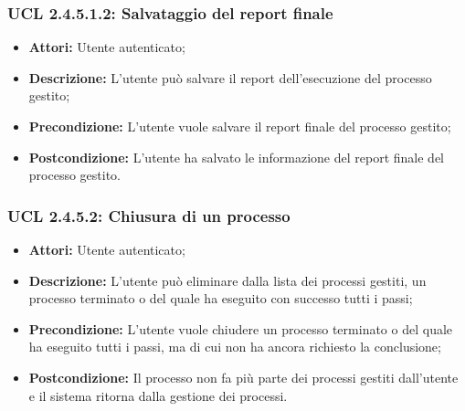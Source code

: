 \hypertarget{L2.4.5.1.2}{}
\subsubsection{UCL 2.4.5.1.2: Salvataggio del report finale}
\begin{itemize}
\item \textbf{Attori:} Utente autenticato;
\item \textbf{Descrizione:} L'utente può salvare il report dell'esecuzione del processo gestito;
\item \textbf{Precondizione:} L'utente vuole salvare il report finale del processo gestito;
\item \textbf{Postcondizione:} L'utente ha salvato le informazione del report finale del processo gestito.
\end{itemize}

\hypertarget{L2.4.5.2}{}
\subsubsection{UCL 2.4.5.2: Chiusura di un processo}
\begin{itemize}
\item \textbf{Attori:} Utente autenticato;
\item \textbf{Descrizione:} L'utente può eliminare dalla lista dei processi gestiti, un processo terminato o del quale ha eseguito con successo tutti i passi;
\item \textbf{Precondizione:} L'utente vuole chiudere un processo terminato o del quale ha eseguito tutti i passi, ma di cui non ha ancora richiesto la conclusione;
\item \textbf{Postcondizione:} Il processo non fa più parte dei processi gestiti dall'utente e il sistema ritorna dalla gestione dei processi.
\end{itemize}

